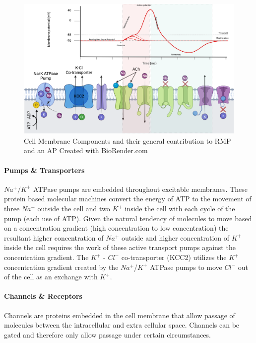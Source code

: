 \begin{figure}[!ht]
    \centering
    \includegraphics[width=1\linewidth]{./figure/cell_membrane.png}
    \caption{Cell Membrane Components and their general contribution to RMP and an AP \footnotesize{Created with BioRender.com}}
    \label{fig:cell_membrane}
\end{figure}


\paragraph{Pumps \& Transporters}
$Na^+/K^+$ ATPase pumps are embedded throughout excitable membranes. These protein based molecular machines convert the energy of ATP to the movement of three $Na^+$ outside the cell and two $K^+$ inside the cell with each cycle of the pump (each use of ATP). Given the natural tendency of molecules to move based on a concentration gradient (high concentration to low concentration) the resultant higher concentration of  $Na^+$ outside and higher concentration of $K^+$ inside the cell requires the work of these active transport pumps against the concentration gradient.
The $K^+$ - $Cl^-$ co-transporter (KCC2) utilizes the $K^+$ concentration gradient created by the $Na^+$/$K^+$ ATPase pumps to move $Cl^-$ out of the cell as an exchange with $K^+$.




\paragraph{Channels \& Receptors}
Channels are proteins embedded in the cell membrane that allow passage of molecules between the intracellular and extra cellular space. Channels can be gated and therefore only allow passage under certain circumstances. 

